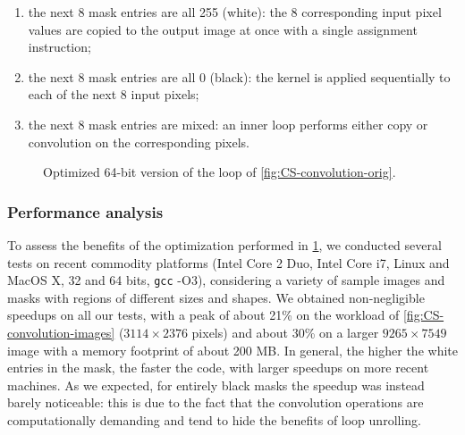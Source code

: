 \begin{enumerate}[itemsep=0pt,parsep=3pt]
\item the next 8 mask entries are all 255 (white): the 8 corresponding input pixel values are copied to the output image at once with a single assignment instruction;
\item the next 8 mask entries are all 0 (black): the kernel is applied sequentially to each of the next 8 input pixels;
\item the next 8 mask entries are mixed: an inner loop performs either copy or convolution on the corresponding pixels.
\end{enumerate}

\begin{figure}[!ht]
\centering
\cprotect{}
\vspace{-2mm}
\caption{Optimized 64-bit version of the loop of \myfigure\ref{fig:CS-convolution-orig}.}
\label{fig:CS-convolution-opt}
\end{figure}

\subsubsection*{Performance analysis}
To assess the benefits of the optimization performed in \myfigure\ref{fig:CS-convolution-opt}, we conducted several tests on recent commodity platforms (Intel Core 2 Duo, Intel Core i7, Linux and MacOS X, 32 and 64 bits, {\tt gcc} -O3), considering a variety of sample images and masks with regions of different sizes and shapes. We obtained non-negligible speedups on all our tests, with a peak of about 21\% on the workload of \myfigure\ref{fig:CS-convolution-images} ($3114\times2376$ pixels) and about 30\% on a larger $9265\times7549$ image with a memory footprint of about 200 MB. In general, the higher the white entries in the mask, the faster the code, with larger speedups on more recent machines. As we expected, for entirely black masks the speedup was instead barely noticeable: this is due to the fact that the convolution operations are computationally demanding and tend to hide the benefits of loop unrolling.

